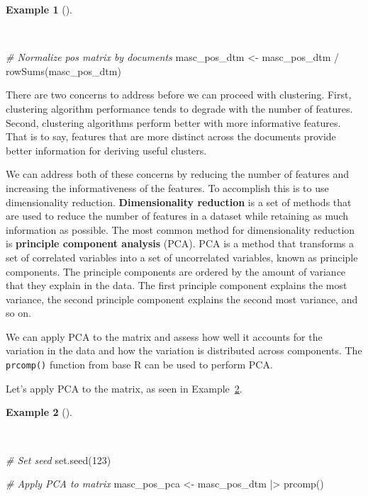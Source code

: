 \documentclass[
  letterpaper,
]{latex/krantz}
\newenvironment{Shaded}{\begin{snugshade}}{\end{snugshade}}
\newcommand{\CommentTok}[1]{\textcolor[rgb]{0.00,0.00,0.00}{\textit{#1}}}
\newcommand{\DecValTok}[1]{\textcolor[rgb]{0.00,0.00,0.00}{#1}}
\newcommand{\FunctionTok}[1]{\textcolor[rgb]{0.00,0.00,0.00}{#1}}
\newcommand{\NormalTok}[1]{\textcolor[rgb]{0.00,0.00,0.00}{#1}}
\newcommand{\OtherTok}[1]{\textcolor[rgb]{0.00,0.00,0.00}{#1}}
\newcommand{\SpecialCharTok}[1]{\textcolor[rgb]{0.00,0.00,0.00}{#1}}
\theoremstyle{definition}
\newtheorem{example}{Example}[chapter]
\theoremstyle{remark}
\begin{document}
\begin{example}[]\protect\hypertarget{exm-explore-masc-dtms-normalized}{}\label{exm-explore-masc-dtms-normalized}

~

\begin{Shaded}
\begin{Highlighting}[]
\CommentTok{\# Normalize pos matrix by documents}
\NormalTok{masc\_pos\_dtm }\OtherTok{\textless{}{-}}
\NormalTok{  masc\_pos\_dtm }\SpecialCharTok{/} \FunctionTok{rowSums}\NormalTok{(masc\_pos\_dtm)}
\end{Highlighting}
\end{Shaded}

\end{example}

There are two concerns to address before we can proceed with clustering.
First, clustering algorithm performance tends to degrade with the number
of features. Second, clustering algorithms perform better with more
informative features. That is to say, features that are more distinct
across the documents provide better information for deriving useful
clusters.

We can address both of these concerns by reducing the number of features
and increasing the informativeness of the features. To accomplish this
is to use dimensionality reduction. \textbf{Dimensionality reduction} is
a set of methods that are used to reduce the number of features in a
dataset while retaining as much information as possible. The most common
method for dimensionality reduction is \textbf{principle component
analysis} (PCA). PCA is a method that transforms a set of correlated
variables into a set of uncorrelated variables, known as principle
components. The principle components are ordered by the amount of
variance that they explain in the data. The first principle component
explains the most variance, the second principle component explains the
second most variance, and so on.

We can apply PCA to the matrix and assess how well it accounts for the
variation in the data and how the variation is distributed across
components. The \texttt{prcomp()} function from base R can be used to
perform PCA.

Let's apply PCA to the matrix, as seen in
Example~\ref{exm-explore-masc-dtms-pca}.

\begin{example}[]\protect\hypertarget{exm-explore-masc-dtms-pca}{}\label{exm-explore-masc-dtms-pca}

~

\begin{Shaded}
\begin{Highlighting}[]
\CommentTok{\# Set seed}
\FunctionTok{set.seed}\NormalTok{(}\DecValTok{123}\NormalTok{)}

\CommentTok{\# Apply PCA to matrix}
\NormalTok{masc\_pos\_pca }\OtherTok{\textless{}{-}}
\NormalTok{  masc\_pos\_dtm }\SpecialCharTok{|\textgreater{}}
  \FunctionTok{prcomp}\NormalTok{()}
\end{Highlighting}
\end{Shaded}

\end{example}
\end{document}
